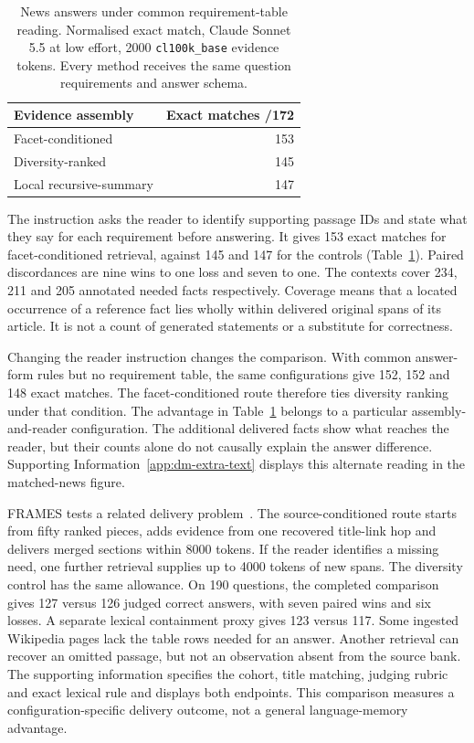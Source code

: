 \documentclass[reprint,aps,prx,superscriptaddress,nofootinbib,longbibliography]{revtex4-2}
\begin{document}
\begin{table}[t]
\caption{News answers under common requirement-table reading.
Normalised exact match, Claude Sonnet 5.5 at low effort, 2000 \texttt{cl100k\_base} evidence tokens.
Every method receives the same question requirements and answer schema.}
\label{tab:news}
\begin{ruledtabular}
\begin{tabular}{lr}
Evidence assembly & Exact matches /172\\
\hline
Facet-conditioned &153\\
Diversity-ranked &145\\
Local recursive-summary &147\\
\end{tabular}
\end{ruledtabular}
\end{table}
The instruction asks the reader to identify supporting passage IDs and state what they say for each requirement before answering.
It gives 153 exact matches for facet-conditioned retrieval, against 145 and 147 for the controls (Table~\ref{tab:news}).
Paired discordances are nine wins to one loss and seven to one.
The contexts cover 234, 211 and 205 annotated needed facts respectively.
Coverage means that a located occurrence of a reference fact lies wholly within delivered original spans of its article.
It is not a count of generated statements or a substitute for correctness.

Changing the reader instruction changes the comparison.
With common answer-form rules but no requirement table, the same configurations give 152, 152 and 148 exact matches.
The facet-conditioned route therefore ties diversity ranking under that condition.
The advantage in Table~\ref{tab:news} belongs to a particular assembly-and-reader configuration.
The additional delivered facts show what reaches the reader, but their counts alone do not causally explain the answer difference.
Supporting Information~\ref{app:dm-extra-text} displays this alternate reading in the matched-news figure.

FRAMES tests a related delivery problem~\cite{frames}.
The source-conditioned route starts from fifty ranked pieces, adds evidence from one recovered title-link hop and delivers merged sections within 8000 tokens.
If the reader identifies a missing need, one further retrieval supplies up to 4000 tokens of new spans.
The diversity control has the same allowance.
On 190 questions, the completed comparison gives 127 versus 126 judged correct answers, with seven paired wins and six losses.
A separate lexical containment proxy gives 123 versus 117.
Some ingested Wikipedia pages lack the table rows needed for an answer.
Another retrieval can recover an omitted passage, but not an observation absent from the source bank.
The supporting information specifies the cohort, title matching, judging rubric and exact lexical rule and displays both endpoints.
This comparison measures a configuration-specific delivery outcome, not a general language-memory advantage.
\end{document}
